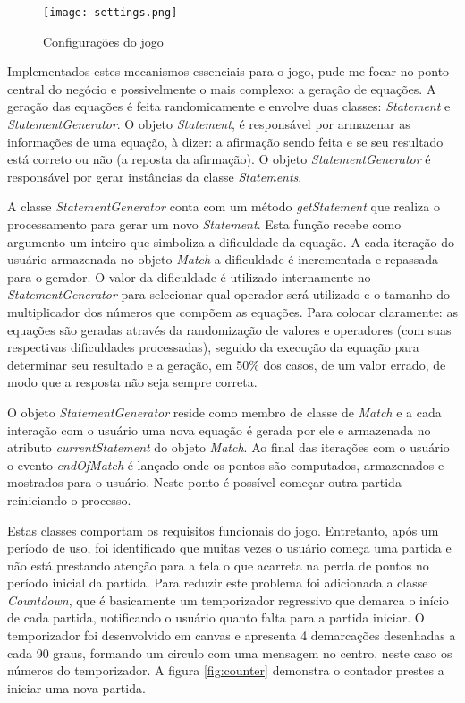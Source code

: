 \begin{figure}
    \centering
    \texttt{[image: settings.png]}
	\caption{Configurações do jogo}
    \label{fig:configurations}
\end{figure}

Implementados estes mecanismos essenciais para o jogo, pude me focar no
ponto central do negócio e possivelmente o mais complexo: a geração
de equações. A geração das equações é feita randomicamente e
envolve duas classes: \textit{Statement} e \textit{StatementGenerator}.
O objeto \textit{Statement}, é responsável por armazenar as
informações de uma equação, à dizer: a afirmação sendo feita
e se seu resultado está correto ou não (a reposta da afirmação).
O objeto \textit{StatementGenerator} é responsável por gerar
instâncias da classe \textit{Statements}.

A classe \textit{StatementGenerator} conta com um método
\textit{getStatement} que realiza o processamento para gerar um novo
\textit{Statement}. Esta função recebe como argumento um inteiro que
simboliza a dificuldade da equação. A cada iteração do usuário
armazenada no objeto \textit{Match} a dificuldade é incrementada
e repassada para o gerador. O valor da dificuldade é utilizado
internamente no \textit{StatementGenerator} para selecionar qual
operador será utilizado e o tamanho do multiplicador dos números
que compõem as equações. Para colocar claramente: as equações
são geradas através da randomização de valores e operadores (com
suas respectivas dificuldades processadas), seguido da execução da
equação para determinar seu resultado e a geração, em 50\% dos
casos, de um valor errado, de modo que a resposta não seja sempre
correta.

O objeto \textit{StatementGenerator} reside como membro de classe de
\textit{Match} e a cada interação com o usuário uma nova equação
é gerada por ele e armazenada no atributo \textit{currentStatement}
do objeto \textit{Match}. Ao final das iterações com o usuário o
evento \textit{endOfMatch} é lançado onde os pontos são computados,
armazenados e mostrados para o usuário. Neste ponto é possível
começar outra partida reiniciando o processo.

Estas classes comportam os requisitos funcionais do jogo. Entretanto,
após um período de uso, foi identificado que muitas vezes o usuário
começa uma partida e não está prestando atenção para a tela o
que acarreta na perda de pontos no período inicial da partida. Para
reduzir este problema foi adicionada a classe \textit{Countdown},
que é basicamente um temporizador regressivo que demarca o início
de cada partida, notificando o usuário quanto falta para a partida
iniciar. O temporizador foi desenvolvido em canvas e apresenta 4
demarcações desenhadas a cada 90 graus, formando um circulo com uma
mensagem no centro, neste caso os números do temporizador. A figura
\ref{fig:counter} demonstra o contador prestes a iniciar uma nova
partida.

